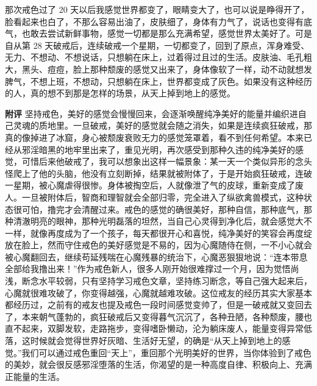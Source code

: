 \begin{case}
    那次戒色过了 20 天以后我感觉世界都变了，眼睛变大了，也可以说是睁得开了，脸看起来也白了，不那么容易出油了，皮肤细了，身体有力气了，说话也变得有底气，也敢去尝试新鲜事物，感觉一切都是那么充满希望，感觉世界太美好了。可是自从第 28 天破戒后，连续破戒一个星期，一切都变了，回到了原点，浑身难受、无力、不想动、不想说话，只想躺在床上，过着得过且过的生活。皮肤油、毛孔粗大，黑头、痘痘，脸上那种颓废的感觉又出来了，身体像软了一样，动不动就想发脾气，不想上班，不想动，只想躺在床上，世界都变成了灰色。如果没有这种经历的人，真的想不到那是怎样的场景，从天上掉到地上的感觉。

    \textbf{附评} 坚持戒色，美好的感觉会慢慢回来，会逐渐唤醒纯净美好的能量并编织进自己灵魂的质地里。一旦破戒，美好的感觉就会随之消失，如果是连续疯狂破戒，那真的像掉进了冰窟，身心被颓废衰败无力的感觉笼罩着，看不到任何希望。本来已经从邪淫暗黑的地牢里出来了，重见光明，再次感受到那种久违的纯净美好的感觉，可惜后来他破戒了，我可以想象出这样一幅景象：某一天一个类似异形的念头怪爬上了他的头脑，他没有立刻断掉，结果就被附体了，于是开始疯狂破戒，连破一星期，被心魔虐得很惨。身体被掏空后，人就像泄了气的皮球，重新变成了废人。一旦被附体后，智商和理智就会全部归零，完全进入了纵欲禽兽模式，这种状态很可怕，撸完才会清醒过来。戒色的感觉的确很美好，那种自信，那种底气，那种清澈明亮的眼神，那种光明磊落的坦然，当自己心灵得到净化后，就会感觉大不一样，就像再度成为了一个孩子，每天都很开心和喜悦，纯净美好的笑容会再度绽放在脸上，然而守住戒色的美好感觉是不易的，因为心魔随侍在侧，一不小心就会被心魔翻回去，继续苟延残喘在心魔残暴的统治下，心魔恶狠狠地说：“连本带息全部给我撸出来！”作为戒色新人，很多人刚开始很难撑过一个月，因为觉悟尚浅，断念水平较弱，只有坚持学习戒色文章，坚持练习断念，等自己强大起来后，心魔就很难攻破了，你变得越强，心魔就越难攻破。这位戒友的经历其实大家基本都经历过，之前有的戒友也提及戒色一段时间感觉变帅了，但是一破戒就又变回去了，本来朝气蓬勃的，疯狂破戒后又变得暮气沉沉了，各种丑陋，各种颓废，腰也直不起来，双脚发软，走路拖步，变得嗜卧懒动，沦为躺床废人，能量变得异常低落，这时候就会觉得世界好灰暗、生活好无望，的确是“从天上掉到地上的感觉。”我们可以通过戒色重回“天上”，重回那个光明美好的世界，当你体验到了戒色的美妙，就会很反感邪淫堕落的生活，你渴望的是一种高度自律、积极向上、充满正能量的生活。
\end{case}


